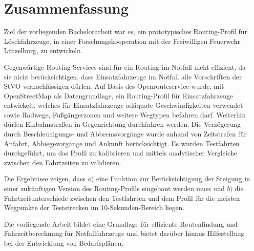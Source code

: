 {\centering\section*{Zusammenfassung}}

\vspace{1cm}

Ziel der vorliegenden Bachelorarbeit war es, ein prototypisches Routing-Profil für Löschfahrzeuge, in einer Forschungskooperation mit der Freiwilligen Feuerwehr Lützelburg, zu entwickeln.
\medskip

Gegenwärtige Routing-Services sind für ein Routing im Notfall nicht effizient, da sie nicht berücksichtigen, dass Einsatzfahrzeuge im Notfall alle Vorschriften der StVO vernachlässigen dürfen.
Auf Basis des Openrouteservice wurde, mit OpenStreetMap als Datengrundlage, ein Routing-Profil für Einsatzfahrzeuge entwickelt, welches für Einsatzfahrzeuge adäquate Geschwindigkeiten verwendet sowie Radwege, Fußgängerzonen und weitere Wegtypen befahren darf.
Weiterhin dürfen Einbahnstraßen in Gegenrichtung durchfahren werden.
Die Verzögerung durch Beschleunigungs- und Abbremsvorgänge wurde anhand von Zeitstrafen für Anfahrt, Abbiegevorgänge und Ankunft berücksichtigt.
Es wurden Testfahrten durchgeführt, um das Profil zu kalibrieren und mittels analytischer Vergleiche zwischen den Fahrtzeiten zu validieren.\par
Die Ergebnisse zeigen, dass \newline $a)$ eine Funktion zur Berücksichtigung der Steigung in einer zukünftigen Version des Routing-Profils eingebaut werden muss und \newline $b)$ die Fahrtzeitunterschiede zwischen den Testfahrten und dem Profil für die meisten Wegpunkte der Teststrecken im 10-Sekunden-Bereich liegen.
\bigskip

Die vorliegende Arbeit bildet eine Grundlage für effiziente Routenfindung und Fahrzeitberechnung für Notfallfahrzeuge und bietet darüber hinaus Hilfestellung bei der Entwicklung von Bedarfsplänen.